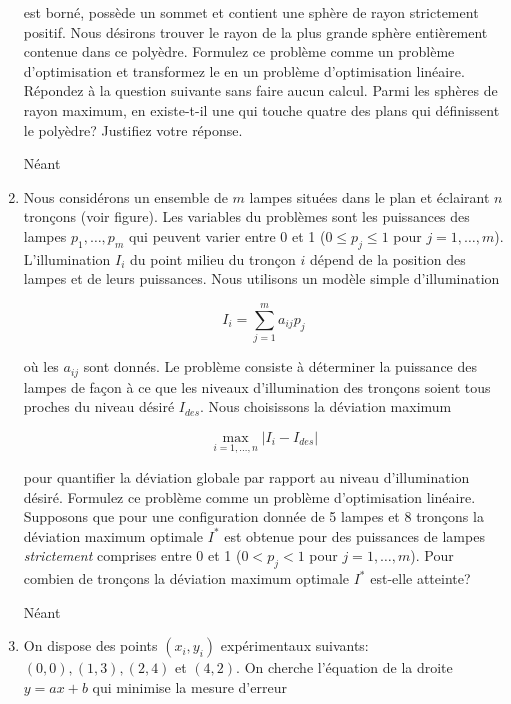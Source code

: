\begin{enumerate}
    est borné, possède un sommet et contient une sphère de rayon strictement positif. Nous désirons trouver le rayon de la plus grande
    sphère entièrement contenue dans ce poly\`edre. Formulez ce problème comme un problème d'optimisation et transformez le en un
    problème d'optimisation linéaire.  Répondez à la question suivante sans faire aucun calcul. Parmi les sphères de rayon
    maximum, en existe-t-il une qui touche quatre des plans qui définissent le poly\`edre? Justifiez votre réponse.






    \begin{solution}
      Néant
    \end{solution}

  \item Nous considérons un ensemble de $m$ lampes situées dans le  plan et éclairant $n$
    tronçons (voir figure).  Les variables du problèmes sont les puissances des lampes $p_1, \ldots, p_m$ qui peuvent varier entre 0 et 1 ($0 \leq p_j \leq 1$ pour
    $j=1, \ldots, m$).  L'illumination $I_i$ du point milieu du tronçon $i$ dépend de la position des lampes et de leurs
    puissances. Nous utilisons un modèle simple d'illumination

    $$I_i = \sum_{j=1}^m a_{ij} p_j$$

    où les $a_{ij}$ sont donnés. Le problème consiste à déterminer la puissance des lampes de façon à ce que les niveaux d'illumination des
    tronçons soient tous proches du niveau désiré $I_{des}$. Nous choisissons la déviation maximum

    $$\max_{i=1, \ldots, n} | I_i -I_{des}|$$

    pour quantifier la déviation globale par rapport au niveau d'illumination désiré.  Formulez ce problème comme un problème d'optimisation linéaire. Supposons
    que pour une configuration donnée de 5 lampes et 8 tronçons la déviation maximum optimale  $I^*$ est obtenue pour des puissances de lampes {\it
    strictement}  comprises entre 0 et 1 ($0 < p_j < 1$ pour $j=1, \ldots, m$). Pour combien de tronçons la déviation maximum optimale $I^*$ est-elle atteinte?





    \begin{solution}
      Néant
    \end{solution}

  \item On dispose des points $(x_i, y_i)$ expérimentaux suivants: $(0, 0), (1, 3), (2, 4)$ et $(4, 2)$. On cherche l'équation de la
    droite $y=ax+b$ qui minimise la mesure d'erreur


\end{enumerate}
